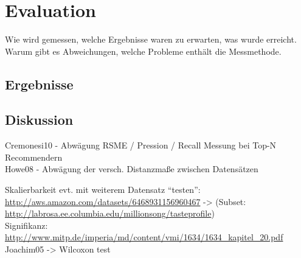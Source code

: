 \section{Evaluation}\label{sec:evaluation}

Wie wird gemessen, welche Ergebnisse waren zu erwarten, was wurde erreicht. Warum gibt es Abweichungen, welche Probleme enthält die Messmethode.
	
\subsection{Ergebnisse}
\subsection{Diskussion}

Cremonesi10 - Abwägung RSME / Pression / Recall Messung bei Top-N Recommendern \\
Howe08 - Abwägung der versch. Distanzmaße zwischen Datensätzen

Skalierbarkeit evt. mit weiterem Datensatz ``testen'': \\
\url{http://aws.amazon.com/datasets/6468931156960467} -> (Subset: \url{http://labrosa.ee.columbia.edu/millionsong/tasteprofile}) \\

Signifikanz: \url{http://www.mitp.de/imperia/md/content/vmi/1634/1634_kapitel_20.pdf} \\
Joachim05 -> Wilcoxon test